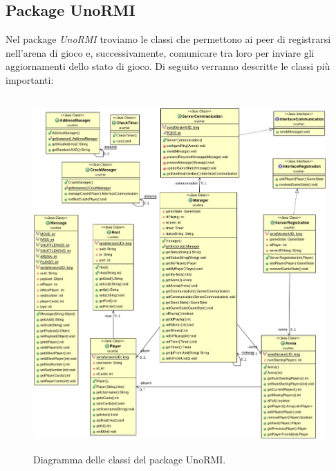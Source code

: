 \documentclass[11pt]{article} %
\begin{document}
\subsection{Package UnoRMI}
Nel package \emph{UnoRMI} troviamo le classi che permettono ai peer di registrarsi nell'arena di gioco e, successivamente, comunicare tra loro per inviare 
gli aggiornamenti dello stato di gioco. Di seguito verranno descritte le classi più importanti:
\begin{figure}[h]
\centering%
\includegraphics[height=13.5cm, width=14cm, keepaspectratio]{unoRMI.png}%
\caption{Diagramma delle classi del package UnoRMI.}
\end{figure}
\end{document}
